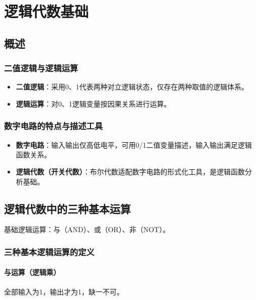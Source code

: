 
\chapter{逻辑代数基础}
\setlength{\parskip}{0.4em}
\setlength{\itemsep}{0.2em}
\setlength{\tabcolsep}{4pt} %

\section{概述}
\subsection{二值逻辑与逻辑运算}
\begin{itemize}
    \item \textbf{二值逻辑}：采用0、1代表两种对立逻辑状态，仅存在两种取值的逻辑体系。
    \item \textbf{逻辑运算}：对0、1逻辑变量按因果关系进行运算。
\end{itemize}

\subsection{数字电路的特点与描述工具}
\begin{itemize}
    \item \textbf{数字电路}：输入输出仅高低电平，可用0/1二值变量描述，输入输出满足逻辑函数关系。
    \item \textbf{逻辑代数（开关代数）}：布尔代数适配数字电路的形式化工具，是逻辑函数分析基础。
\end{itemize}

\section{逻辑代数中的三种基本运算}
基础逻辑运算：与（AND）、或（OR）、非（NOT）。

\subsection{三种基本逻辑运算的定义}
\subsubsection{与运算（逻辑乘）}
全部输入为1，输出才为1，缺一不可。

